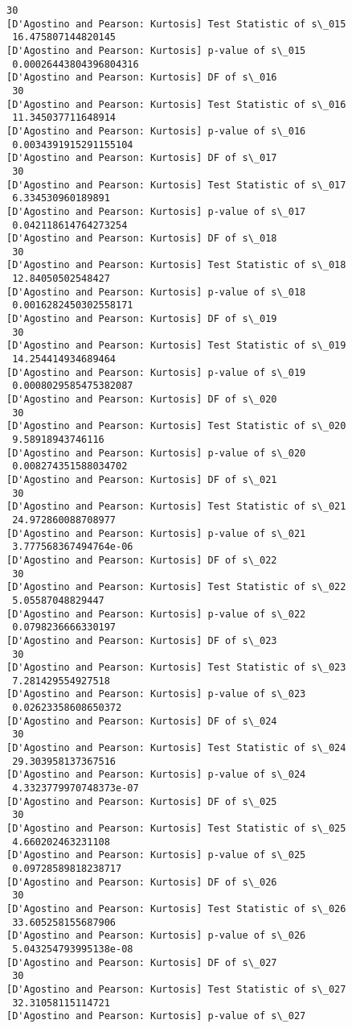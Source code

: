 \documentclass[11pt]{article}
\begin{document}
\begin{Verbatim}[commandchars=\\\{\}]
 30
[D'Agostino and Pearson: Kurtosis] Test Statistic of s\_015
 16.475807144820145
[D'Agostino and Pearson: Kurtosis] p-value of s\_015
 0.00026443804396804316
[D'Agostino and Pearson: Kurtosis] DF of s\_016
 30
[D'Agostino and Pearson: Kurtosis] Test Statistic of s\_016
 11.345037711648914
[D'Agostino and Pearson: Kurtosis] p-value of s\_016
 0.0034391915291155104
[D'Agostino and Pearson: Kurtosis] DF of s\_017
 30
[D'Agostino and Pearson: Kurtosis] Test Statistic of s\_017
 6.334530960189891
[D'Agostino and Pearson: Kurtosis] p-value of s\_017
 0.042118614764273254
[D'Agostino and Pearson: Kurtosis] DF of s\_018
 30
[D'Agostino and Pearson: Kurtosis] Test Statistic of s\_018
 12.84050502548427
[D'Agostino and Pearson: Kurtosis] p-value of s\_018
 0.0016282450302558171
[D'Agostino and Pearson: Kurtosis] DF of s\_019
 30
[D'Agostino and Pearson: Kurtosis] Test Statistic of s\_019
 14.254414934689464
[D'Agostino and Pearson: Kurtosis] p-value of s\_019
 0.0008029585475382087
[D'Agostino and Pearson: Kurtosis] DF of s\_020
 30
[D'Agostino and Pearson: Kurtosis] Test Statistic of s\_020
 9.58918943746116
[D'Agostino and Pearson: Kurtosis] p-value of s\_020
 0.008274351588034702
[D'Agostino and Pearson: Kurtosis] DF of s\_021
 30
[D'Agostino and Pearson: Kurtosis] Test Statistic of s\_021
 24.972860088708977
[D'Agostino and Pearson: Kurtosis] p-value of s\_021
 3.777568367494764e-06
[D'Agostino and Pearson: Kurtosis] DF of s\_022
 30
[D'Agostino and Pearson: Kurtosis] Test Statistic of s\_022
 5.05587048829447
[D'Agostino and Pearson: Kurtosis] p-value of s\_022
 0.0798236666330197
[D'Agostino and Pearson: Kurtosis] DF of s\_023
 30
[D'Agostino and Pearson: Kurtosis] Test Statistic of s\_023
 7.281429554927518
[D'Agostino and Pearson: Kurtosis] p-value of s\_023
 0.02623358608650372
[D'Agostino and Pearson: Kurtosis] DF of s\_024
 30
[D'Agostino and Pearson: Kurtosis] Test Statistic of s\_024
 29.303958137367516
[D'Agostino and Pearson: Kurtosis] p-value of s\_024
 4.3323779970748373e-07
[D'Agostino and Pearson: Kurtosis] DF of s\_025
 30
[D'Agostino and Pearson: Kurtosis] Test Statistic of s\_025
 4.660202463231108
[D'Agostino and Pearson: Kurtosis] p-value of s\_025
 0.09728589818238717
[D'Agostino and Pearson: Kurtosis] DF of s\_026
 30
[D'Agostino and Pearson: Kurtosis] Test Statistic of s\_026
 33.605258155687906
[D'Agostino and Pearson: Kurtosis] p-value of s\_026
 5.043254793995138e-08
[D'Agostino and Pearson: Kurtosis] DF of s\_027
 30
[D'Agostino and Pearson: Kurtosis] Test Statistic of s\_027
 32.31058115114721
[D'Agostino and Pearson: Kurtosis] p-value of s\_027

\end{Verbatim}
\end{document}
